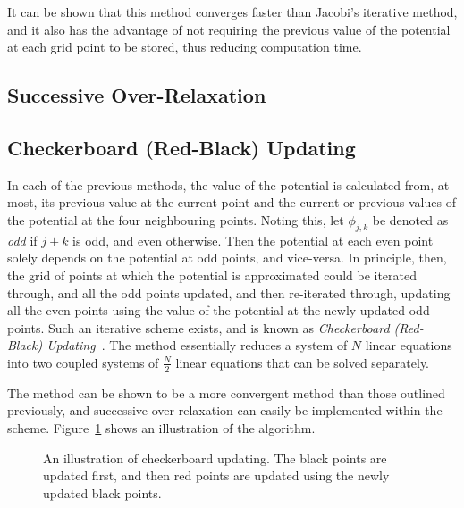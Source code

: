 \documentclass[11pt, a4paper]{article}
\begin{document}
It can be shown that this method converges faster than Jacobi's iterative
method, and it also has the advantage of not requiring the previous value of the 
potential at each grid point to be stored, thus reducing computation time.

\subsection{Successive Over-Relaxation}


\subsection{Checkerboard (Red-Black) Updating}

In each of the previous methods, the value of the potential is calculated from, at most,
its previous value at the current point and the current or previous values of the
potential at the four neighbouring points. Noting this, let $\phi_{j,k}$ be denoted as
\emph{odd} if $j+k$ is odd, and even otherwise. Then the potential at each even point
solely depends on the potential at odd points, and vice-versa. In principle, then,
the grid of points at which the potential is approximated could be iterated through,
and all the odd points updated, and then re-iterated through, updating all the
even points using the value of the potential at the newly updated odd points. Such an
iterative scheme exists, and is known as \emph{Checkerboard (Red-Black) Updating}~\cite{wallach}. The
method essentially reduces a system of $N$ linear equations into two coupled systems
of $\frac{N}{2}$ linear equations that can be solved separately.

The method can be shown to be a more convergent method than those outlined previously,
and successive over-relaxation can easily be implemented within the scheme.
Figure~\ref{fig:checker} shows an illustration of the algorithm.

\begin{figure}[h!]
\begin{center}
\end{center}
\caption{An illustration of checkerboard updating. The black points are updated first,
and then red points are updated using the newly updated black points.}
\label{fig:checker}
\end{figure}
\end{document}
